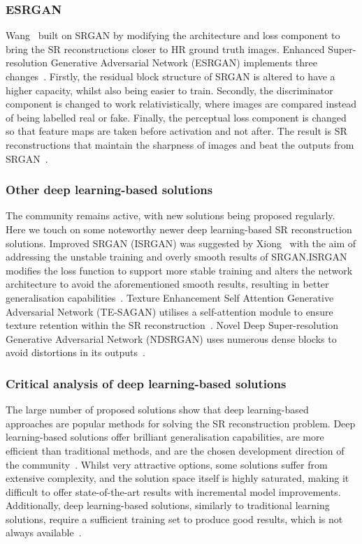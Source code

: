 \subsubsection{ESRGAN}
Wang \etal\ built on SRGAN by modifying the architecture and loss component to bring the SR reconstructions closer to HR ground truth images. Enhanced Super-resolution Generative Adversarial Network (ESRGAN) implements three changes~\cite{esrgan}. Firstly, the residual block structure of SRGAN is altered to have a higher capacity, whilst also being easier to train. Secondly, the discriminator component is changed to work relativistically, where images are compared instead of being labelled real or fake. Finally, the perceptual loss component is changed so that feature maps are taken before activation and not after. The result is SR reconstructions that maintain the sharpness of images and beat the outputs from SRGAN~\cite{esrgan}.

\subsubsection{Other deep learning-based solutions}
The community remains active, with new solutions being proposed regularly. Here we touch on some noteworthy newer deep learning-based SR reconstruction solutions. Improved SRGAN (ISRGAN) was suggested by Xiong \etal\ with the aim of addressing the unstable training and overly smooth results of SRGAN.\@ ISRGAN modifies the loss function to support more stable training and alters the network architecture to  avoid the aforementioned smooth results, resulting in better generalisation capabilities~\cite{isrgan,remoteSensingGANsReview}. Texture Enhancement Self Attention Generative Adversarial Network (TE-SAGAN) utilises a self-attention module to ensure texture retention within the SR reconstruction~\cite{tesagan, remoteSensingGANsReview}. Novel Deep Super-resolution Generative Adversarial Network (NDSRGAN) uses numerous dense blocks to avoid distortions in its outputs~\cite{ndsrgan, remoteSensingGANsReview}. 

\subsubsection{Critical analysis of deep learning-based solutions}
The large number of proposed solutions show that deep learning-based approaches are popular methods for solving the SR reconstruction problem. Deep learning-based solutions offer brilliant generalisation capabilities, are more efficient than traditional methods, and are the chosen development direction of the community~\cite{ndsrgan}. Whilst very attractive options, some solutions suffer from extensive complexity, and the solution space itself is highly saturated, making it difficult to offer state-of-the-art results with incremental model improvements. Additionally, deep learning-based solutions, similarly to traditional learning solutions, require a sufficient training set to produce good results, which is not always available~\cite{superResRemoteSensingOverview}.

